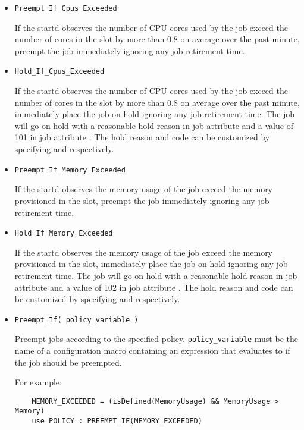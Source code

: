 \begin{description}
\begin{itemize}
	\item \texttt{Preempt\_If\_Cpus\_Exceeded}

	If the startd observes the number of CPU cores used by the job exceed
	the number of cores in the slot by more than 0.8 on average over the past
	minute, preempt the job immediately
	ignoring any job retirement time.

	\item \texttt{Hold\_If\_Cpus\_Exceeded}

	If the startd observes the number of CPU cores used by the job exceed
	the number of cores in the slot by more than 0.8 on average over the past
	minute, immediately place the job on hold
	ignoring any job retirement time.  The job will go on hold with a reasonable
	hold reason in job attribute  and a value of 101 in job
	attribute .  The hold reason and code can be customized by
	specifying  and
	 respectively.

	\item \texttt{Preempt\_If\_Memory\_Exceeded}

	If the startd observes the memory usage of the job exceed
	the memory provisioned in the slot, preempt the job immediately
	ignoring any job retirement time.

	\item \texttt{Hold\_If\_Memory\_Exceeded}

	If the startd observes the memory usage of the job exceed
	the memory provisioned in the slot,
	immediately place the job on hold
	ignoring any job retirement time.
	The job will go on hold with a reasonable
	hold reason in job attribute  and a value of 102 in job
	attribute .  The hold reason and code can be customized by
	specifying  and
	 respectively.

	\item \texttt{Preempt\_If( policy\_variable )}

	Preempt jobs according to the specified policy.
	\texttt{policy\_variable} must be the name of a configuration macro
	containing an expression that evaluates to  if the job
	should be preempted.

	For example:

    \begin{verbatim}
	MEMORY_EXCEEDED = (isDefined(MemoryUsage) && MemoryUsage > Memory)
	use POLICY : PREEMPT_IF(MEMORY_EXCEEDED)
    \end{verbatim}


\end{itemize}
\end{description}
